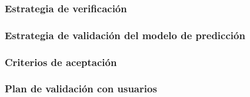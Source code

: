 
\subsubsection{Estrategia de verificación}


\subsubsection{Estrategia de validación del modelo de predicción}


\subsubsection{Criterios de aceptación}


\subsubsection{Plan de validación con usuarios}

